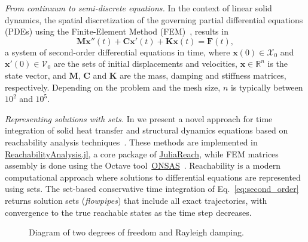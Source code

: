 \documentclass{juliacon}
\begin{document}
	


\maketitle

\emph{From continuum to semi-discrete equations.} In the context of linear solid dynamics, the spatial discretization of the governing partial differential equations (PDEs) using the Finite-Element Method (FEM)~\cite{Bathe2014}, results in
%
\begin{equation}\label{eq:second_order}
\mathbf{M} \mathbf{x}''(t) + \mathbf{C}\mathbf{x}'(t) + \mathbf{K}\mathbf{x}(t) = \mathbf{F}(t),
\end{equation}
%
a system of second-order differential equations in time, where $\mathbf{x}(0) \in \mathcal{X}_0$ and $\mathbf{x}'(0) \in \mathcal{V}_0$ are the sets of initial displacements and velocities, $\mathbf{x} \in \mathbb{R}^n$ is the state vector, and $\mathbf{M}$, $\mathbf{C}$ and $\mathbf{K}$ are the mass, damping and stiffness matrices, respectively. Depending on the problem and the mesh size, $n$ is typically  between $10^2$ and $10^5$.
	
\vspace{0.2cm}

\emph{Representing solutions with sets.} In \cite{forets2021combining} we present a novel approach for time integration of solid heat transfer and structural dynamics equations based on reachability analysis techniques~\cite{althoff2020set}. These methods are implemented in \href{http://github.com/JuliaReach/ReachabilityAnalysis.jl}{ReachabilityAnalysis.jl}, a core package of \href{http://juliareach.com}{JuliaReach}, while FEM matrices assembly is done using the Octave tool~\href{http://onsas.org}{ONSAS}~\cite{onsas}.
%
Reachability is a modern computational approach where solutions to differential equations are represented using sets.
%
The set-based conservative time integration of Eq.~\eqref{eq:second_order} returns solution sets (\emph{flowpipes}) that include all exact trajectories, with convergence to the true reachable states as the time step decreases.

\vspace{-0.1cm}

\begin{figure}[htb]
	\centering
 \def\svgwidth{0.25\textwidth}
 
 \caption{Diagram of two degrees of freedom and Rayleigh damping.}
 \label{fig:diagram}
\end{figure}
\end{document}
